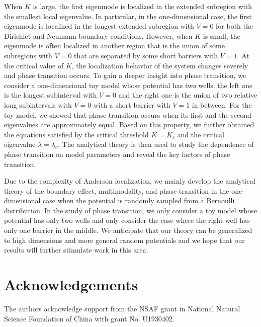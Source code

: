 \documentclass[a4paper,11pt]{article}
\begin{document}
When $K$ is large, the first eigenmode is localized in the extended subregion with the smallest local eigenvalue. In particular, in the one-dimensional case, the first eigenmode is localized in the longest extended subregion with $V = 0$ for both the Dirichlet and Neumann boundary conditions. However, when $K$ is small, the eigenmode is often localized in another region that is the union of some subregions with $V = 0$ that are separated by some short barriers with $V = 1$. At the critical value of $K$, the localization behavior of the system changes severely and phase transition occurs. To gain a deeper insight into phase transition, we consider a one-dimensional toy model whose potential has two wells: the left one is the longest subinterval with $V = 0$ and the right one is the union of two relative long subintervals with $V = 0$ with a short barrier with $V = 1$ in between. For the toy model, we showed that phase transition occurs when its first and the second eigenvalues are approximately equal. Based on this property, we further obtained the equations satisfied by the critical threshold $K = K_c$ and the critical eigenvalue $\lambda = \lambda_c$. The analytical theory is then used to study the dependence of phase transition on model parameters and reveal the key factors of phase transition.

Due to the complexity of Anderson localization, we mainly develop the analytical theory of the boundary effect, multimodality, and phase transition in the one-dimensional case when the potential is randomly sampled from a Bernoulli distribution. In the study of phase transition, we only consider a toy model whose potential has only two wells and only consider the case where the right well has only one barrier in the middle. We anticipate that our theory can be generalized to high dimensions and more general random potentials and we hope that our results will further stimulate work in this area.


\section*{Acknowledgements}
The authors acknowledge support from the NSAF grant in National Natural Science Foundation of China with grant No. U1930402.
\end{document}
